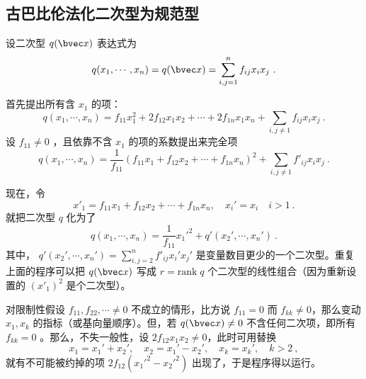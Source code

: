 \subsection{古巴比伦法化二次型为规范型}
设二次型 $q(\bvec x)$ 表达式为
\begin{equation}
q(x_1,\cdots,x_n)=q(\bvec x)=\sum\limits_{i,j=1}^n f_{ij}x_ix_j~.
\end{equation}

首先提出所有含 $x_1$ 的项：
\begin{equation}
q(x_1,\cdots,x_n)=f_{11} x_1^2+2f_{12}x_1x_2+\cdots+2f_{1n}x_1x_n+\sum_{i,j\neq1}f_{ij}x_ix_j~.
\end{equation}
设 $f_{11}\neq0$ ，且依靠不含 $x_1$ 的项的系数提出来完全项
\begin{equation}
q(x_1,\cdots,x_n)=\frac{1}{f_{11}}(f_{11}x_1+f_{12}x_2+\cdots+f_{1n}x_n)^2+\sum_{i,j\neq1}f'_{ij}x_ix_j~.
\end{equation}

现在，令
\begin{equation}
x'_1=f_{11}x_1+f_{12}x_2+\cdots+f_{1n}x_n,\quad x_i'=x_i\quad i>1~.
\end{equation}
就把二次型 $q$ 化为了
\begin{equation}
q(x_1,\cdots,x_n)=\frac{1}{f_{11}}x_1'^2+q'(x_2',\cdots,x_n')~.
\end{equation}
其中， $q'(x_2',\cdots,x_n')=\sum\limits_{i,j=2}^nf'_{ij}x_i'x_j'$ 是变量数目更少的一个二次型。重复上面的程序可以把 $q(\bvec x)$ 写成 $r=\mathrm{rank}\; q$ 个二次型的线性组合（因为重新设置的 $(x'_1)^2$ 是个二次型）。

对限制性假设 $f_{11},f_{22},\cdots\neq0$ 不成立的情形，比方说 $f_{11}=0$ 而 $f_{kk}\neq0$，那么变动 $x_1,x_k$ 的指标（或基向量顺序）。但，若 $q(\bvec x)\neq0$ 不含任何二次项，即所有 $f_{kk}=0$ 。那么，不失一般性，设 $2f_{12}x_1x_2\neq0$，此时可用替换
\begin{equation}
x_1=x_1'+x_2',\quad x_2=x_1'-x_2',\quad x_k=x_k',\quad k>2~,
\end{equation}
就有不可能被约掉的项 $2f_{12}(x_1'^2-x_2'^2)$ 出现了，于是程序得以运行。
